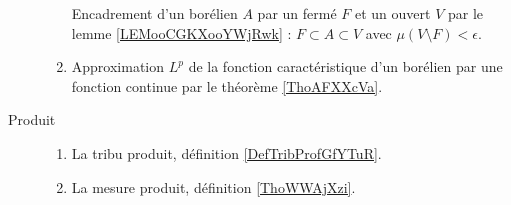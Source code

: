 \begin{description}
\begin{enumerate}
		            Encadrement d'un borélien \( A\) par un fermé \( F\) et un ouvert \( V\) par le lemme \ref{LEMooCGKXooYWjRwk} : \( F\subset A\subset V\) avec \( \mu(V\setminus F)<\epsilon\).
		      \item
		            Approximation \( L^p\) de la fonction caractéristique d'un borélien par une fonction continue par le théorème \ref{ThoAFXXcVa}.
	      \end{enumerate}
      \item[Produit]
          \begin{enumerate}
              \item
                  La tribu produit, définition \ref{DefTribProfGfYTuR}.
              \item
                  La mesure produit, définition \ref{ThoWWAjXzi}.
          \end{enumerate}
\end{description}

